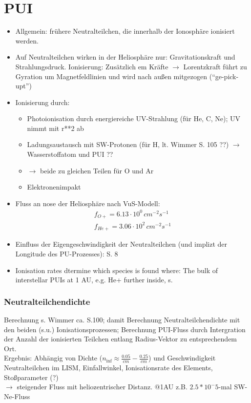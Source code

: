 \documentclass[]{article}
\begin{document}
\section{PUI}
\begin{itemize}
	\item Allgemein: frühere Neutralteilchen, die innerhalb der Ionosphäre ionisiert werden.
	\item Auf Neutralteilchen wirken in der Heliosphäre nur: Gravitationskraft und Strahlungsdruck. Ionisierung: Zusätzlich em Kräfte $\rightarrow$ Lorentzkraft führt zu Gyration um Magnetfeldlinien und wird nach außen mitgezogen (``ge-pick-upt'')
	\item Ionisierung durch:
	\begin{itemize}
		\item Photoionisation durch energiereiche UV-Strahlung (für He, C, Ne); UV nimmt mit r**2 ab
		\item Ladungsaustausch mit SW-Protonen (für H, lt. Wimmer S. 105 ??) $\rightarrow$ Wasserstoffatom und PUI ??
		\item $\rightarrow$ beide zu gleichen Teilen für O und Ar
		\item Elektronenimpakt
	\end{itemize}
	\item Fluss an nose der Heliosphäre nach VuS-Modell:
	\begin{align*}
	f_{O+} = 6.13\cdot10^0\,cm^{-2}s^{-1} \\
	f_{He+} = 3.06\cdot10^2\,cm^{-2}s^{-1}
	\end{align*}
	\item Einfluss der Eigengeschwindigkeit der Neutralteilchen (und implizt der Longitude des PU-Prozesses): \cite{drews_2015} S. 8
	\item Ionisation rates dtermine which species is found where: The bulk of interstellar PUIs at 1 AU, e.g. He+ further inside, s. \cite{vasyl_siscoe_1976}
\end{itemize}


\subsubsection{Neutralteilchendichte} Berechnung s. Wimmer ca. S.100; damit Berechnung Neutralteilchendichte mit den beiden (s.u.) Ionisationsprozessen; Berechnung PUI-Fluss durch Intergration der Anzahl der ionisierten Teilchen entlang Radius-Vektor zu entsprechendem Ort.
\\
Ergebnis: Abhängig von Dichte ($n_{\inf} \approx \frac{0.05}{cm} - \frac{0.25}{cm}$) und Geschwindigkeit Neutralteilchen im LISM, Einfallwinkel, Ionisationsrate des Elements, Stoßparameter (?)\\
$\rightarrow$ steigender Fluss mit heliozentrischer Distanz. @1AU z.B. $2.5*10^-5$-mal SW-Ne-Fluss
%
\end{document}
